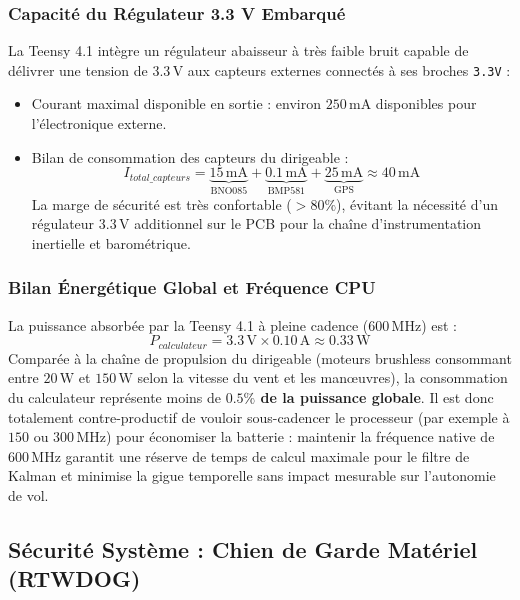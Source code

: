 \documentclass[../Materiel.tex]{subfiles}
\begin{document}
\subsubsection{Capacité du Régulateur 3.3 V Embarqué}
La Teensy 4.1 intègre un régulateur abaisseur à très faible bruit capable de délivrer une tension de $3.3\,\text{V}$ aux capteurs externes connectés à ses broches \texttt{3.3V} :
\begin{itemize}
    \item Courant maximal disponible en sortie : environ $250\,\text{mA}$ disponibles pour l'électronique externe.
    \item Bilan de consommation des capteurs du dirigeable :
    \begin{equation}
        I_{total\_capteurs} = \underbrace{15\,\text{mA}}_{\text{BNO085}} + \underbrace{0.1\,\text{mA}}_{\text{BMP581}} + \underbrace{25\,\text{mA}}_{\text{GPS}} \approx 40\,\text{mA}
    \end{equation}
    La marge de sécurité est très confortable ($> 80\%$), évitant la nécessité d'un régulateur $3.3\,\text{V}$ additionnel sur le PCB pour la chaîne d'instrumentation inertielle et barométrique.
\end{itemize}

\subsubsection{Bilan Énergétique Global et Fréquence CPU}
La puissance absorbée par la Teensy 4.1 à pleine cadence ($600\,\text{MHz}$) est :
\begin{equation}
    P_{calculateur} = 3.3\,\text{V} \times 0.10\,\text{A} \approx 0.33\,\text{W}
\end{equation}
Comparée à la chaîne de propulsion du dirigeable (moteurs brushless consommant entre $20\,\text{W}$ et $150\,\text{W}$ selon la vitesse du vent et les manœuvres), la consommation du calculateur représente moins de \textbf{$0.5\%$ de la puissance globale}. Il est donc totalement contre-productif de vouloir sous-cadencer le processeur (par exemple à $150$ ou $300\,\text{MHz}$) pour économiser la batterie : maintenir la fréquence native de $600\,\text{MHz}$ garantit une réserve de temps de calcul maximale pour le filtre de Kalman et minimise la gigue temporelle sans impact mesurable sur l'autonomie de vol.

\subsection{Sécurité Système : Chien de Garde Matériel (RTWDOG)}
\end{document}
